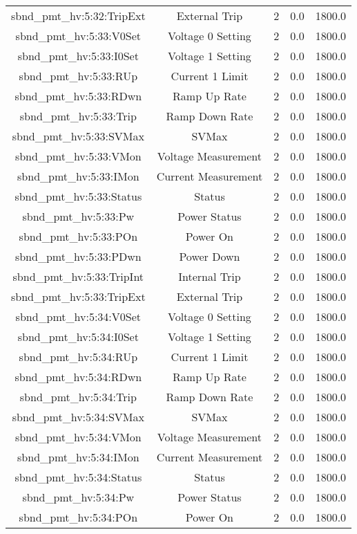 \begin{table}[ptb]
\begin{tabular}{c | c c c c}
sbnd_pmt_hv:5:32:TripExt & External Trip & 2 & 0.0 & 1800.0\\ 
sbnd_pmt_hv:5:33:V0Set & Voltage 0 Setting & 2 & 0.0 & 1800.0\\ 
sbnd_pmt_hv:5:33:I0Set & Voltage 1 Setting & 2 & 0.0 & 1800.0\\ 
sbnd_pmt_hv:5:33:RUp & Current 1 Limit & 2 & 0.0 & 1800.0\\ 
sbnd_pmt_hv:5:33:RDwn & Ramp Up Rate & 2 & 0.0 & 1800.0\\ 
sbnd_pmt_hv:5:33:Trip & Ramp Down Rate & 2 & 0.0 & 1800.0\\ 
sbnd_pmt_hv:5:33:SVMax & SVMax & 2 & 0.0 & 1800.0\\ 
sbnd_pmt_hv:5:33:VMon & Voltage Measurement & 2 & 0.0 & 1800.0\\ 
sbnd_pmt_hv:5:33:IMon & Current Measurement & 2 & 0.0 & 1800.0\\ 
sbnd_pmt_hv:5:33:Status & Status & 2 & 0.0 & 1800.0\\ 
sbnd_pmt_hv:5:33:Pw & Power Status & 2 & 0.0 & 1800.0\\ 
sbnd_pmt_hv:5:33:POn & Power On & 2 & 0.0 & 1800.0\\ 
sbnd_pmt_hv:5:33:PDwn & Power Down & 2 & 0.0 & 1800.0\\ 
sbnd_pmt_hv:5:33:TripInt & Internal Trip & 2 & 0.0 & 1800.0\\ 
sbnd_pmt_hv:5:33:TripExt & External Trip & 2 & 0.0 & 1800.0\\ 
sbnd_pmt_hv:5:34:V0Set & Voltage 0 Setting & 2 & 0.0 & 1800.0\\ 
sbnd_pmt_hv:5:34:I0Set & Voltage 1 Setting & 2 & 0.0 & 1800.0\\ 
sbnd_pmt_hv:5:34:RUp & Current 1 Limit & 2 & 0.0 & 1800.0\\ 
sbnd_pmt_hv:5:34:RDwn & Ramp Up Rate & 2 & 0.0 & 1800.0\\ 
sbnd_pmt_hv:5:34:Trip & Ramp Down Rate & 2 & 0.0 & 1800.0\\ 
sbnd_pmt_hv:5:34:SVMax & SVMax & 2 & 0.0 & 1800.0\\ 
sbnd_pmt_hv:5:34:VMon & Voltage Measurement & 2 & 0.0 & 1800.0\\ 
sbnd_pmt_hv:5:34:IMon & Current Measurement & 2 & 0.0 & 1800.0\\ 
sbnd_pmt_hv:5:34:Status & Status & 2 & 0.0 & 1800.0\\ 
sbnd_pmt_hv:5:34:Pw & Power Status & 2 & 0.0 & 1800.0\\ 
sbnd_pmt_hv:5:34:POn & Power On & 2 & 0.0 & 1800.0\\ 

\end{tabular}
\end{table}
